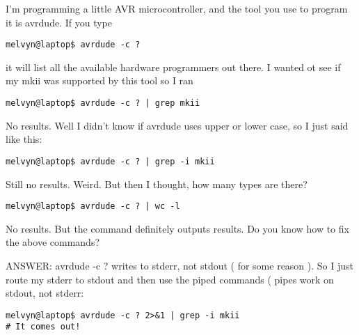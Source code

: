 \documentclass[12pt,a4paper]{article}
\begin{document}
I'm programming a little AVR microcontroller, and the tool you use to program it
is avrdude. If you type 
\begin{lstlisting}[style=term]
melvyn@laptop$ avrdude -c ?
\end{lstlisting}

it will list all the available hardware programmers out there. I wanted ot see
if my mkii was supported by this tool so I ran

\begin{lstlisting}[style=term]
melvyn@laptop$ avrdude -c ? | grep mkii
\end{lstlisting}

No results. Well I didn't know if avrdude uses upper or lower case, so I just
said like this:

\begin{lstlisting}[style=term]
melvyn@laptop$ avrdude -c ? | grep -i mkii
\end{lstlisting}

Still no results. Weird. But then I thought, how many types are there?

\begin{lstlisting}[style=term]
melvyn@laptop$ avrdude -c ? | wc -l
\end{lstlisting}

No results. But the command definitely outputs results. Do you know how to fix
the above commands?

ANSWER: avrdude -c ?  writes to stderr, not stdout ( for some reason ). So I
just route my stderr to stdout and then use the piped commands ( pipes work on
stdout, not stderr:

\begin{lstlisting}[style=term]
melvyn@laptop$ avrdude -c ? 2>&1 | grep -i mkii
# It comes out!
\end{lstlisting}
\end{document}
